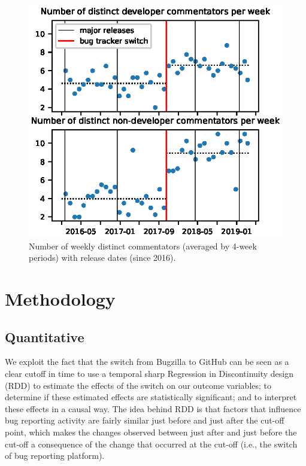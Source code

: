 \documentclass[conference]{IEEEtran}
\begin{document}
\begin{figure}
\includegraphics{commentators_with_releases.eps}
\caption{Number of weekly distinct commentators (averaged by 4-week periods) with release dates (since 2016).} \label{commentators_with_releases}
\end{figure}

\section{Methodology}
\label{methodology}

\subsection{Quantitative}
We exploit the fact that the switch from Bugzilla to GitHub can be seen as a clear cutoff in time to use a temporal sharp Regression in Discontinuity design (RDD) to estimate the effects of the switch on our outcome variables; to determine if these estimated effects are statistically significant; and to interpret these effects in a causal way. 
The idea behind RDD is that factors that influence bug reporting activity are fairly similar just before and just after the cut-off point, which makes the changes observed between just after and just before the cut-off a consequence of the change that occurred at the cut-off (i.e., the switch of bug reporting platform).
\end{document}
